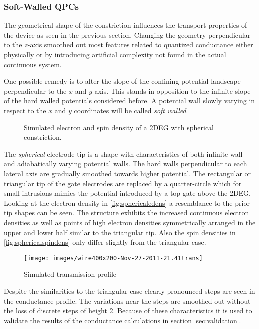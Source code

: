 \subsubsection{Soft-Walled QPCs}
The geometrical shape of the constriction influences the transport properties of the device as seen in the previous section. Changing the geometry perpendicular to the $z$-axis smoothed out most features related to quantized conductance either physically or by introducing artificial complexity not found in the actual continuous system.\par
One possible remedy is to alter the slope of the confining potential landscape perpendicular to the $x$ and $y$-axis. This stands in opposition to the infinite slope of the hard walled potentials considered before. A potential wall slowly varying in respect to the $x$ and $y$ coordinates will be called \emph{soft walled}.\par
\begin{figure}[h]
\caption{Simulated electron and spin density of a 2DEG with spherical constriction.}
\end{figure}
The \emph{spherical} electrode tip is a shape with characteristics of both infinite wall and adiabatically varying potential walls. The hard walls perpendicular to each lateral axis are gradually smoothed towards higher potential. The rectangular or triangular tip of the gate electrodes are replaced by a quarter-circle which for small intrusions mimics the potential introduced by a top gate above the 2DEG. Looking at the electron density in \cref{fig:sphericaledens} a resemblance to the prior tip shapes can be seen. The structure exhibits the increased continuous electron densities as well as points of high electron densities symmetrically arranged in the upper and lower half similar to the triangular tip. Also the spin densities in \cref{fig:sphericalspindens} only differ slightly from the triangular case.\par
\begin{figure}[h]
\centering
\texttt{[image: images/wire400x200-Nov-27-2011-21.41trans]}
\caption{Simulated transmission profile}
\end{figure}
Despite the similarities to the triangular case clearly pronounced steps are seen in the conductance profile. The variations near the steps are smoothed out without the loss of discrete steps of height 2. Because of these characteristics it is used to validate the results of the conductance calculations in section \ref{sec:validation}.\par
